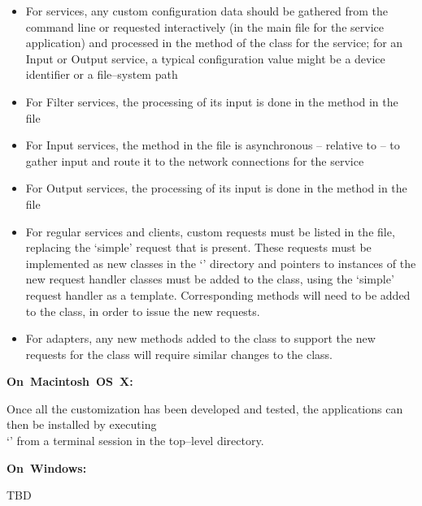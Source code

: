 \begin{itemize}
\item For  services, any custom configuration data should be gathered from
the command line or requested interactively (in the main file for the service
application) and processed in the  method of the class for the service;
for an Input or Output service, a typical configuration value might be a device
identifier or a file--system path
\item For Filter services, the processing of its input is done in the 
method in the\\
 file
\item For Input services, the  method in the 
file is asynchronous -- relative to \mplusm{} -- to gather input and route it to the
\yarp{} network connections for the service
\item For Output services, the processing of its input is done in the 
method in the\\
 file
\item For regular services and clients, custom requests must be listed in the
 file, replacing the `simple' request that is present.
These requests must be implemented as new classes in the `' directory
and pointers to instances of the new request handler classes must be added to the
 class, using the `simple' request handler as a template.
Corresponding methods will need to be added to the  class, in order to
issue the new requests.
\item For adapters, any new methods added to the  class to support the
new requests for the  class will require similar changes to the
 class.
\end{itemize}
\tertiaryEnd{}
\begin{center}\textbf{On~Macintosh~OS~X:}\end{center}
Once all the customization has been developed and tested, the applications can then be
installed by executing\\
`' from a terminal session in the top--level directory.
\begin{center}\textbf{On~Windows:}\end{center}
TBD
\tertiaryEnd{}
\secondaryEnd{}
\appendixEnd{}
